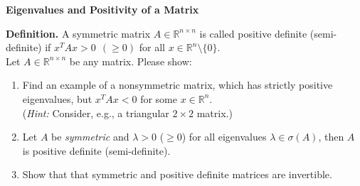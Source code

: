 \textbf{Eigenvalues and Positivity of a Matrix}

{\color{navy}
	\textbf{Definition.} A symmetric matrix $A\in \mathbb{R}^{n\times n}$ is called positive definite (semi-definite) if $x^TAx > 0 ~~(\geq 0)$ for all $x \in \mathbb{R}^n\setminus\{0\}$.\\[10pt]}
Let $A\in \mathbb{R}^{n\times n}$ be any matrix. Please show:
\begin{enumerate}
	\item Find an example of a nonsymmetric matrix, which has strictly positive eigenvalues, but  $x^TAx < 0$ for some $x \in \mathbb{R}^n$.\\
	(\textit{Hint:} Consider, e.g., a triangular $2 \times 2$ matrix.)
	\item Let $A$ be \textit{symmetric} and $\lambda > 0$ ($\geq 0$) for all eigenvalues $\lambda \in \sigma(A)$, then $A$ is positive definite (semi-definite).
	\item Show that that symmetric and positive definite matrices are invertible.
\end{enumerate}
